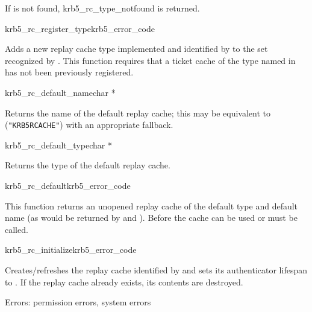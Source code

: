 If  is not found, {\sc krb5_rc_type_notfound} is returned.

\begin{funcdecl}{krb5_rc_register_type}{krb5_error_code}{\funcin}
\end{funcdecl}
Adds a new replay cache type implemented and identified by
 to the set recognized by
.  This function requires that a ticket
cache of the type named in 
 has not been previously registered.


\begin{funcdecl}{krb5_rc_default_name}{char *}{\funcin}
\end{funcdecl}

\begin{sloppypar}
Returns  the name of the default replay cache; this may be equivalent to
({\tt "KRB5RCACHE"}) with an appropriate fallback.
\end{sloppypar}

\begin{funcdecl}{krb5_rc_default_type}{char *}{\funcin}
\end{funcdecl}

Returns the type of the default replay cache.

\begin{funcdecl}{krb5_rc_default}{krb5_error_code}{\funcinout}
\end{funcdecl}

This function returns an unopened replay cache of the default type and
default name (as would be returned by 
and ).  Before the cache can be used
 or  must be
called.


\begin{funcdecl}{krb5_rc_initialize}{krb5_error_code}{\funcin}
\end{funcdecl}

Creates/refreshes the replay cache identified by  and sets its
authenticator lifespan to .  If the 
replay cache already exists, its contents are destroyed.

Errors: permission errors, system errors

